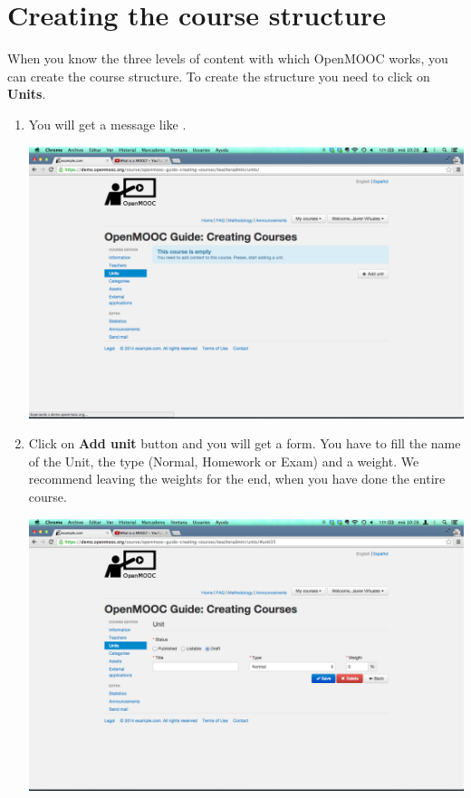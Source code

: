 \documentclass[letterpaper,10pt,english]{sphinxmanual}
\begin{document}
\section{Creating the course structure}
\label{course_units:creating-the-course-structure}
When you know the three levels of content with which OpenMOOC works, you can create the course structure.
To create the structure you need to click on \textbf{Units}.
\begin{enumerate}
\item {} 
You will get a message like .

\includegraphics{4_course_units-1.png}

\item {} 
Click on \textbf{Add unit} button and you will get a form. You have to fill the name of the Unit, the type (Normal, Homework or Exam) and a weight. We recommend leaving the weights for the end, when you have done the entire course.

\includegraphics{4_course_units-2.png}


\end{enumerate}
\end{document}
